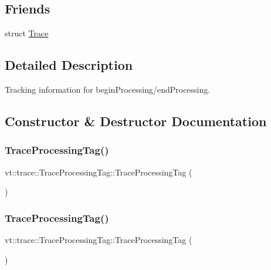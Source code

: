 \subsection*{Friends}
\begin{DoxyCompactItemize}
\item 
struct \hyperlink{structvt_1_1trace_1_1_trace_processing_tag_a2e6db6037effb09584d7eba75b16dec4}{Trace}
\end{DoxyCompactItemize}


\subsection{Detailed Description}
Tracking information for begin\+Processing/end\+Processing. 

\subsection{Constructor \& Destructor Documentation}
\mbox{\label{structvt_1_1trace_1_1_trace_processing_tag_af06f6265d03791717242e1cec769dd84}} 
\subsubsection{\texorpdfstring{Trace\+Processing\+Tag()}{TraceProcessingTag()}\hspace{0.1cm}{\footnotesize\ttfamily [1/3]}}
{\footnotesize\ttfamily vt\+::trace\+::\+Trace\+Processing\+Tag\+::\+Trace\+Processing\+Tag (\begin{DoxyParamCaption}{ }\end{DoxyParamCaption})\hspace{0.3cm}{\ttfamily [default]}}

\mbox{\label{structvt_1_1trace_1_1_trace_processing_tag_a332019e755f6265ab0a74626322c590f}} 
\subsubsection{\texorpdfstring{Trace\+Processing\+Tag()}{TraceProcessingTag()}\hspace{0.1cm}{\footnotesize\ttfamily [2/3]}}
{\footnotesize\ttfamily vt\+::trace\+::\+Trace\+Processing\+Tag\+::\+Trace\+Processing\+Tag (\begin{DoxyParamCaption}\item[{\hyperlink{structvt_1_1trace_1_1_trace_processing_tag}{Trace\+Processing\+Tag} const \&}]{ }\end{DoxyParamCaption})\hspace{0.3cm}{\ttfamily [default]}}

